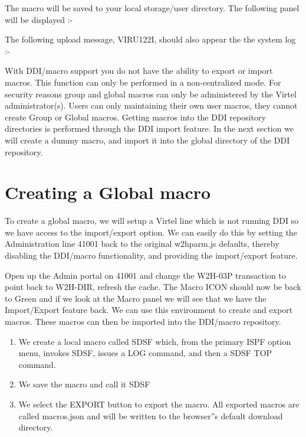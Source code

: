 \documentclass[letterpaper,10pt,english]{sphinxmanual}
\begin{document}
The macro will be saved to your local storage/user directory. The following panel will be displayed :-



The following upload message, VIRU122I, should also appear the the system log :-



With DDI/macro support you do not have the ability to export or import macros. This function can only be performed in a non-centralized mode. For security reasons group and global macros can only be administered by the Virtel administrator(s). Users can only maintaining their own user macros, they cannot create Group or Global macros. Getting macros into the DDI repository directories is performed through the DDI import feature. In the next section we will create a dummy macro, and import it into the global directory of the DDI repository.


\section{Creating a Global macro}
\label{\detokenize{TN202002:creating-a-global-macro}}
To create a global macro, we will setup a Virtel line which is not running DDI so we have access to the import/export option. We can easily do this by setting the Administration line 41001 back to the original w2hparm.js defaults, thereby disabling the DDI/macro functionality, and providing the import/export feature.

Open up the Admin portal on 41001 and change the W2H-03P transaction to point back to W2H-DIR, refresh the cache. The Macro ICON should now be back to Green and if we look at the Macro panel we will see that we have the Import/Export feature back. We can use this environment to create and export macros. These macros can then be imported into the DDI/macro repository.

\begin{enumerate}
\def\theenumi{\arabic{enumi}}
\def\labelenumi{\theenumi .}
\makeatletter\def\p@enumii{\p@enumi \theenumi .}\makeatother
\item {} 
We create a local macro called SDSF which, from the primary ISPF option menu, invokes SDSF, issues a LOG command, and then a SDSF TOP command.

\item {} 
We save the macro and call it SDSF

\item {} 
We select the EXPORT button to export the macro. All exported macros are called macros.json and will be written to the browser”s default download directory.

\end{enumerate}
\end{document}
